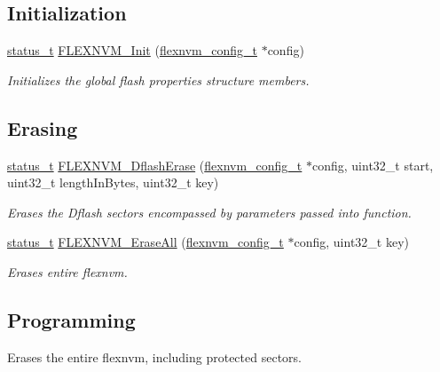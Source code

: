 \subsection*{Initialization}
\begin{DoxyCompactItemize}
\item 
\mbox{\hyperlink{group__ksdk__common_gaaabdaf7ee58ca7269bd4bf24efcde092}{status\+\_\+t}} \mbox{\hyperlink{group__ftfx__flexnvm__driver_gac07ad15ba63f1ec86217eeb8c2df3520}{F\+L\+E\+X\+N\+V\+M\+\_\+\+Init}} (\mbox{\hyperlink{group__ftfx__flexnvm__driver_ga8fd4d473c0a4b30cac163160fb28a6c1}{flexnvm\+\_\+config\+\_\+t}} $\ast$config)
\begin{DoxyCompactList}\small\item\em Initializes the global flash properties structure members. \end{DoxyCompactList}\end{DoxyCompactItemize}
\subsection*{Erasing}
\begin{DoxyCompactItemize}
\item 
\mbox{\hyperlink{group__ksdk__common_gaaabdaf7ee58ca7269bd4bf24efcde092}{status\+\_\+t}} \mbox{\hyperlink{group__ftfx__flexnvm__driver_ga5fd0d2df3119387d00af533d11fa79bf}{F\+L\+E\+X\+N\+V\+M\+\_\+\+Dflash\+Erase}} (\mbox{\hyperlink{group__ftfx__flexnvm__driver_ga8fd4d473c0a4b30cac163160fb28a6c1}{flexnvm\+\_\+config\+\_\+t}} $\ast$config, uint32\+\_\+t start, uint32\+\_\+t length\+In\+Bytes, uint32\+\_\+t key)
\begin{DoxyCompactList}\small\item\em Erases the Dflash sectors encompassed by parameters passed into function. \end{DoxyCompactList}\item 
\mbox{\hyperlink{group__ksdk__common_gaaabdaf7ee58ca7269bd4bf24efcde092}{status\+\_\+t}} \mbox{\hyperlink{group__ftfx__flexnvm__driver_ga83fb93b84479299ded0b9b2f881dd157}{F\+L\+E\+X\+N\+V\+M\+\_\+\+Erase\+All}} (\mbox{\hyperlink{group__ftfx__flexnvm__driver_ga8fd4d473c0a4b30cac163160fb28a6c1}{flexnvm\+\_\+config\+\_\+t}} $\ast$config, uint32\+\_\+t key)
\begin{DoxyCompactList}\small\item\em Erases entire flexnvm. \end{DoxyCompactList}\end{DoxyCompactItemize}
\subsection*{Programming}
\label{_amgrpe6f43c40ab1c07cd29e4e83e4ef6bf85}%
Erases the entire flexnvm, including protected sectors.


